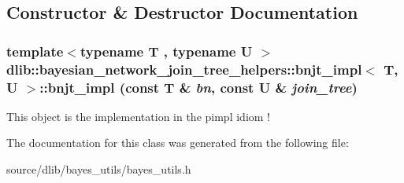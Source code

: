 \subsection{Constructor \& Destructor Documentation}
\hypertarget{classdlib_1_1bayesian__network__join__tree__helpers_1_1bnjt__impl_a5e845b2196c0ebddd50c919a1d62ce9a}{
\subsubsection[{bnjt\_\-impl}]{\setlength{\rightskip}{0pt plus 5cm}template$<$typename T , typename U $>$ {\bf dlib::bayesian\_\-network\_\-join\_\-tree\_\-helpers::bnjt\_\-impl}$<$ T, U $>$::{\bf bnjt\_\-impl} (const T \& {\em bn}, \/  const U \& {\em join\_\-tree})}}
\label{classdlib_1_1bayesian__network__join__tree__helpers_1_1bnjt__impl_a5e845b2196c0ebddd50c919a1d62ce9a}
This object is the implementation in the pimpl idiom ! 

The documentation for this class was generated from the following file:\begin{DoxyCompactItemize}
\item 
source/dlib/bayes\_\-utils/bayes\_\-utils.h\end{DoxyCompactItemize}
